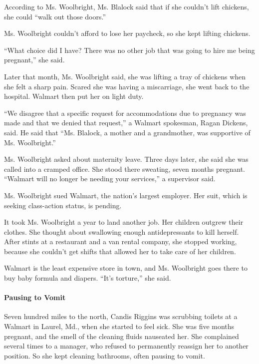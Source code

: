 According to Ms. Woolbright, Ms. Blalock said that if she couldn't lift
chickens, she could ``walk out those doors.''

Ms. Woolbright couldn't afford to lose her paycheck, so she kept lifting
chickens.

``What choice did I have? There was no other job that was going to hire
me being pregnant,'' she said.

Later that month, Ms. Woolbright said, she was lifting a tray of
chickens when she felt a sharp pain. Scared she was having a
miscarriage, she went back to the hospital. Walmart then put her on
light duty.

``We disagree that a specific request for accommodations due to
pregnancy was made and that we denied that request,'' a Walmart
spokesman, Ragan Dickens, said. He said that ``Ms. Blalock, a mother and
a grandmother, was supportive of Ms. Woolbright.''

Ms. Woolbright asked about maternity leave. Three days later, she said
she was called into a cramped office. She stood there sweating, seven
months pregnant. ``Walmart will no longer be needing your services,'' a
supervisor said.

Ms. Woolbright sued Walmart, the nation's largest employer. Her suit,
which is seeking class-action status, is pending.

It took Ms. Woolbright a year to land another job. Her children outgrew
their clothes. She thought about swallowing enough antidepressants to
kill herself. After stints at a restaurant and a van rental company, she
stopped working, because she couldn't get shifts that allowed her to
take care of her children.

Walmart is the least expensive store in town, and Ms. Woolbright goes
there to buy baby formula and diapers. ``It's torture,'' she said.

\hypertarget{pausing-to-vomit}{%
\paragraph{Pausing to Vomit}\label{pausing-to-vomit}}

Seven hundred miles to the north, Candis Riggins was scrubbing toilets
at a Walmart in Laurel, Md., when she started to feel sick. She was five
months pregnant, and the smell of the cleaning fluids nauseated her. She
complained several times to a manager, who refused to permanently
reassign her to another position. So she kept cleaning bathrooms, often
pausing to vomit.


